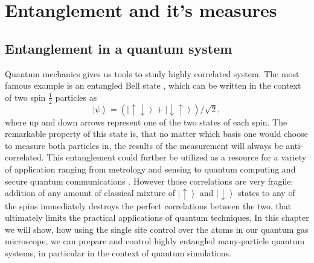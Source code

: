 
\chapter{Entanglement and it's measures}

\section{Entanglement in a quantum system}
Quantum mechanics gives us tools to study highly correlated system. The most famous example is an entangled Bell state \cite{something}, which can be written in the context of two spin $\frac{1}{2}$ particles as 
\begin{equation}
\left| \psi \right>=(\left| \uparrow \downarrow \right>+ \left| \downarrow \uparrow \right>)/\sqrt{2},
\end{equation}
where up and down arrows represent one of the two states of each spin. The remarkable property of this state is, that no matter which basis one would choose to measure both particles in, the results of the measurement will always be anti-correlated. This entanglement could further be utilized as a resource for a variety of application ranging from metrology and sensing \cite{sombody} to quantum computing \cite{Chuang book} and secure quantum communications \cite{something}. However those correlations are very fragile: addition of any amount of classical mixture of $\left| \uparrow \right>$ and $\left| \downarrow \right>$ states to any of the spins immediately destroys the perfect correlations between the two, that ultimately limits the practical applications of quantum techniques. In this chapter we will show, how using the single site control over the atoms in our quantum gas microscope, we can prepare and control highly entangled many-particle quantum systems, in particular in the context of quantum simulations. 